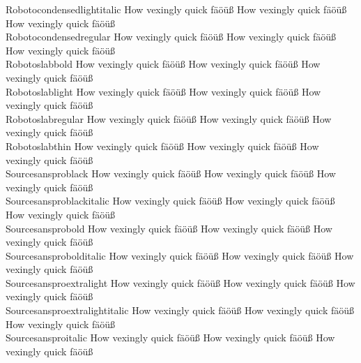 \begin{tabbing}
Robotocondensedlightitalic \> {\mktsStyleNormal{}How vexingly quick fäöüß} {\Robotocondensedlightitalic{}How vexingly quick fäöüß} {\mktsStyleItalic{}How vexingly quick fäöüß} \\
Robotocondensedregular \> {\mktsStyleNormal{}How vexingly quick fäöüß} {\Robotocondensedregular{}How vexingly quick fäöüß} {\mktsStyleItalic{}How vexingly quick fäöüß} \\
Robotoslabbold \> {\mktsStyleNormal{}How vexingly quick fäöüß} {\Robotoslabbold{}How vexingly quick fäöüß} {\mktsStyleItalic{}How vexingly quick fäöüß} \\
Robotoslablight \> {\mktsStyleNormal{}How vexingly quick fäöüß} {\Robotoslablight{}How vexingly quick fäöüß} {\mktsStyleItalic{}How vexingly quick fäöüß} \\
Robotoslabregular \> {\mktsStyleNormal{}How vexingly quick fäöüß} {\Robotoslabregular{}How vexingly quick fäöüß} {\mktsStyleItalic{}How vexingly quick fäöüß} \\
Robotoslabthin \> {\mktsStyleNormal{}How vexingly quick fäöüß} {\Robotoslabthin{}How vexingly quick fäöüß} {\mktsStyleItalic{}How vexingly quick fäöüß} \\
Sourcesansproblack \> {\mktsStyleNormal{}How vexingly quick fäöüß} {\Sourcesansproblack{}How vexingly quick fäöüß} {\mktsStyleItalic{}How vexingly quick fäöüß} \\
Sourcesansproblackitalic \> {\mktsStyleNormal{}How vexingly quick fäöüß} {\Sourcesansproblackitalic{}How vexingly quick fäöüß} {\mktsStyleItalic{}How vexingly quick fäöüß} \\
Sourcesansprobold \> {\mktsStyleNormal{}How vexingly quick fäöüß} {\Sourcesansprobold{}How vexingly quick fäöüß} {\mktsStyleItalic{}How vexingly quick fäöüß} \\
Sourcesansprobolditalic \> {\mktsStyleNormal{}How vexingly quick fäöüß} {\Sourcesansprobolditalic{}How vexingly quick fäöüß} {\mktsStyleItalic{}How vexingly quick fäöüß} \\
Sourcesansproextralight \> {\mktsStyleNormal{}How vexingly quick fäöüß} {\Sourcesansproextralight{}How vexingly quick fäöüß} {\mktsStyleItalic{}How vexingly quick fäöüß} \\
Sourcesansproextralightitalic \> {\mktsStyleNormal{}How vexingly quick fäöüß} {\Sourcesansproextralightitalic{}How vexingly quick fäöüß} {\mktsStyleItalic{}How vexingly quick fäöüß} \\
Sourcesansproitalic \> {\mktsStyleNormal{}How vexingly quick fäöüß} {\Sourcesansproitalic{}How vexingly quick fäöüß} {\mktsStyleItalic{}How vexingly quick fäöüß} \\

\end{tabbing}
